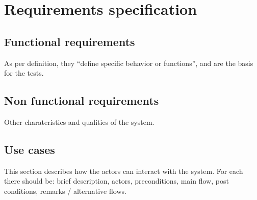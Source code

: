 \section{Requirements specification}



\subsection{Functional requirements}
As per definition, they ``define specific behavior or functions'', and are the basis for the tests.

\subsection{Non functional requirements}
Other charateristics and qualities of the system.

\subsection{Use cases}
This section describes how the actors can interact with the system. 
For each there should be: brief description, actors, preconditions, main flow, post conditions, remarks / alternative flows.
